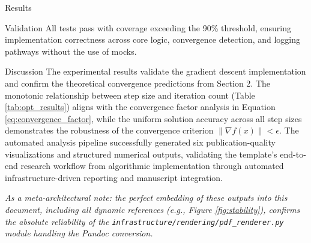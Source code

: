 \documentclass[
  ignorenonframetext,
]{beamer}
\begin{document}
\begin{frame}[fragile]{Results}
\begin{block}{Validation}
All tests pass with coverage exceeding the 90\% threshold, ensuring
implementation correctness across core logic, convergence detection, and
logging pathways without the use of mocks.
\end{block}

\begin{block}{Discussion}
\protect{}\label{discussion}
The experimental results validate the gradient descent implementation
and confirm the theoretical convergence predictions from Section 2. The
monotonic relationship between step size and iteration count (Table
\ref{tab:opt_results}) aligns with the convergence factor analysis in
Equation \ref{eq:convergence_factor}, while the uniform solution
accuracy across all step sizes demonstrates the robustness of the
convergence criterion \(\|\nabla f(x)\| < \epsilon\). The automated
analysis pipeline successfully generated six publication-quality
visualizations and structured numerical outputs, validating the
template's end-to-end research workflow from algorithmic implementation
through automated infrastructure-driven reporting and manuscript
integration.

\emph{As a meta-architectural note: the perfect embedding of these
outputs into this document, including all dynamic references (e.g.,
Figure \ref{fig:stability}), confirms the absolute reliability of the
\texttt{infrastructure/rendering/pdf\_renderer.py} module handling the
Pandoc conversion.}
\end{block}
\end{frame}
\end{document}
